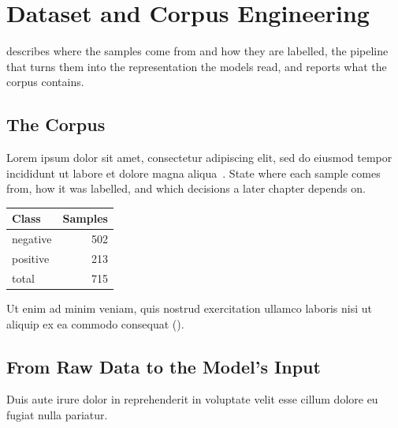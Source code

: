 \chapter{Dataset and Corpus Engineering}
\label{chap:dataset}

 describes where the samples come from and how they are labelled,  the pipeline that turns them into the representation the models read, and  reports what the corpus contains.

\section{The Corpus}
\label{sec:data-corpus}

Lorem ipsum dolor sit amet, consectetur adipiscing elit, sed do eiusmod tempor incididunt ut labore et dolore magna aliqua~\cite{example_Website_2026}.
State where each sample comes from, how it was labelled, and which decisions a later chapter depends on.

\begin{margintable}
  \centering
  \caption[Corpus composition]{What the corpus holds, per class.}
  \label{tab:data-corpus}
  \small
  \begin{tabular}{@{}lr@{}}
    \toprule
    Class & Samples \\
    \midrule
    negative & 502 \\
    positive & 213 \\
    \midrule
    total & 715 \\
    \bottomrule
  \end{tabular}
\end{margintable}

Ut enim ad minim veniam, quis nostrud exercitation ullamco laboris nisi ut aliquip ex ea commodo consequat ().

\section{From Raw Data to the Model's Input}
\label{sec:data-pipeline}

Duis aute irure dolor in reprehenderit in voluptate velit esse cillum dolore eu fugiat nulla pariatur.


